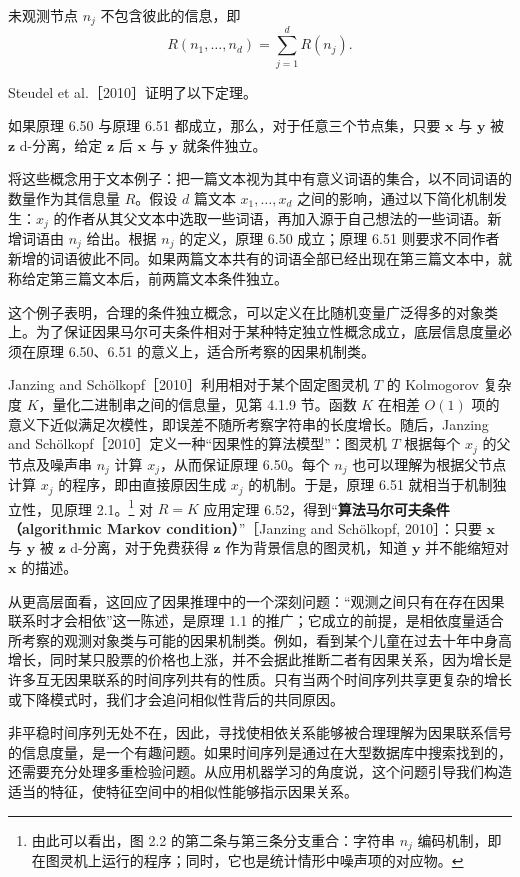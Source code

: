 \begin{principle}[未观测对象的独立性]
未观测节点 $n_j$ 不包含彼此的信息，即
\[
 R(n_1,\ldots,n_d)=\sum_{j=1}^d R(n_j).
\]
\end{principle}

Steudel et al.［2010］证明了以下定理。

\begin{theorem}[广义因果马尔可夫条件]
如果原理 6.50 与原理 6.51 都成立，那么，对于任意三个节点集，只要 $\mathbf x$ 与 $\mathbf y$ 被 $\mathbf z$ d-分离，给定 $\mathbf z$ 后 $\mathbf x$ 与 $\mathbf y$ 就条件独立。
\end{theorem}

将这些概念用于文本例子：把一篇文本视为其中有意义词语的集合，以不同词语的数量作为其信息量 $R$。假设 $d$ 篇文本 $x_1,\ldots,x_d$ 之间的影响，通过以下简化机制发生：$x_j$ 的作者从其父文本中选取一些词语，再加入源于自己想法的一些词语。新增词语由 $n_j$ 给出。根据 $n_j$ 的定义，原理 6.50 成立；原理 6.51 则要求不同作者新增的词语彼此不同。如果两篇文本共有的词语全部已经出现在第三篇文本中，就称给定第三篇文本后，前两篇文本条件独立。

这个例子表明，合理的条件独立概念，可以定义在比随机变量广泛得多的对象类上。为了保证因果马尔可夫条件相对于某种特定独立性概念成立，底层信息度量必须在原理 6.50、6.51 的意义上，适合所考察的因果机制类。

Janzing and Schölkopf［2010］利用相对于某个固定图灵机 $T$ 的 Kolmogorov 复杂度 $K$，量化二进制串之间的信息量，见第 4.1.9 节。函数 $K$ 在相差 $O(1)$ 项的意义下近似满足次模性，即误差不随所考察字符串的长度增长。随后，Janzing and Schölkopf［2010］定义一种“因果性的算法模型”：图灵机 $T$ 根据每个 $x_j$ 的父节点及噪声串 $n_j$ 计算 $x_j$，从而保证原理 6.50。每个 $n_j$ 也可以理解为根据父节点计算 $x_j$ 的程序，即由直接原因生成 $x_j$ 的机制。于是，原理 6.51 就相当于机制独立性，见原理 2.1。\footnote{由此可以看出，图 2.2 的第二条与第三条分支重合：字符串 $n_j$ 编码机制，即在图灵机上运行的程序；同时，它也是统计情形中噪声项的对应物。}
对 $R=K$ 应用定理 6.52，得到“\textbf{算法马尔可夫条件（algorithmic Markov condition）}”［Janzing and Schölkopf, 2010］：只要 $\mathbf x$ 与 $\mathbf y$ 被 $\mathbf z$ d-分离，对于免费获得 $\mathbf z$ 作为背景信息的图灵机，知道 $\mathbf y$ 并不能缩短对 $\mathbf x$ 的描述。

从更高层面看，这回应了因果推理中的一个深刻问题：“观测之间只有在存在因果联系时才会相依”这一陈述，是原理 1.1 的推广；它成立的前提，是相依度量适合所考察的观测对象类与可能的因果机制类。例如，看到某个儿童在过去十年中身高增长，同时某只股票的价格也上涨，并不会据此推断二者有因果关系，因为增长是许多互无因果联系的时间序列共有的性质。只有当两个时间序列共享更复杂的增长或下降模式时，我们才会追问相似性背后的共同原因。

非平稳时间序列无处不在，因此，寻找使相依关系能够被合理理解为因果联系信号的信息度量，是一个有趣问题。如果时间序列是通过在大型数据库中搜索找到的，还需要充分处理多重检验问题。从应用机器学习的角度说，这个问题引导我们构造适当的特征，使特征空间中的相似性能够指示因果关系。
\FloatBarrier
